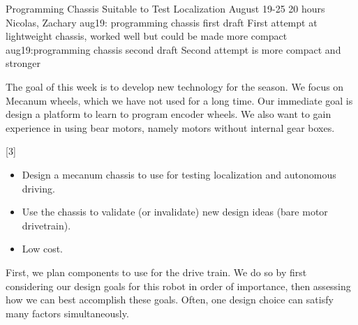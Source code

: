  \begin{Meeting}[Preseason]
      {Programming Chassis Suitable to Test Localization}  
      {August 19-25}
      {20 hours}
      {Nicolas, Zachary}
      {
           {aug19: programming chassis first draft}
           {First attempt at lightweight chassis, worked well but could be made more compact}
           {aug19:programming chassis second draft}
           {Second attempt is more compact and stronger}
      }
 
\MeetingSummary
 
The goal of this week is to develop new technology for the season. We
focus on Mecanum wheels, which we have not used for a long time. Our
immediate goal is design a platform to learn to program encoder
wheels. We also want to gain experience in using bear motors, namely
motors without internal gear boxes.


[3]
 
\begin{itemize}
  \item Design a mecanum chassis to use for testing localization and autonomous driving.
  \item Use the chassis to validate (or invalidate) new design ideas (bare motor drivetrain).
  \item Low cost.
 \end{itemize}


First, we plan components to use for the drive train. We do so by
first considering our design goals for this robot in order of
importance, then assessing how we can best accomplish these
goals. Often, one design choice can satisfy many factors
simultaneously.


\end{Meeting}
